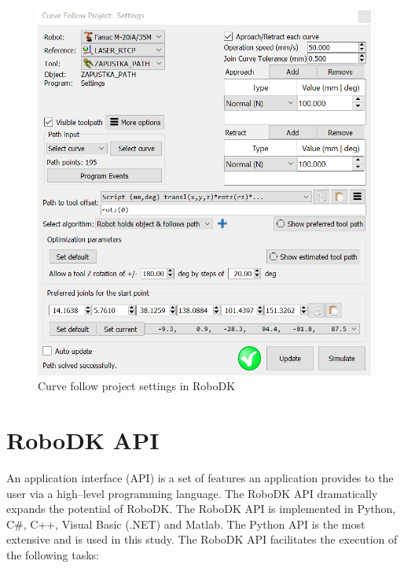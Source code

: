 \begin{figure}[h]
    \centering
    \includegraphics[width=0.9\linewidth]{img/curve_follow_settings.PNG}
    \caption{Curve follow project settings in RoboDK}
    \label{fig:curvefollow}
\end{figure}

\section{RoboDK API}

An application interface (API) is a set of features an application provides to the user via a high--level programming language. The RoboDK API dramatically expands the potential of RoboDK. The RoboDK API is implemented in Python, C\#, C++, Visual Basic (.NET) and Matlab.  The Python API is the most extensive and is used in this study. The RoboDK API facilitates the execution of the following tasks:


